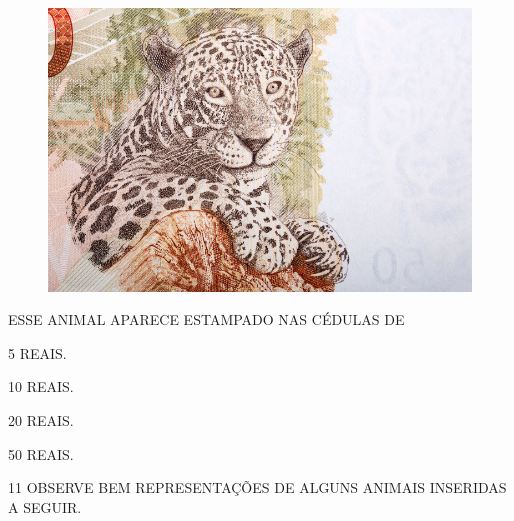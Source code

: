 \begin{minipage}{.6\textwidth}
\begin{figure}[H]
\centering
\includegraphics[width=\textwidth]{./media/SAEB_1ANO_MAT_FIGURA140.png}
\end{figure}
\end{minipage}
\hspace{0.5cm}
\begin{minipage}{.3\textwidth}
ESSE ANIMAL APARECE ESTAMPADO NAS CÉDULAS DE

\begin{escolha}%
\item 5 REAIS.

\item 10 REAIS.

\item 20 REAIS.

\item 50 REAIS.
\end{escolha}
\end{minipage}

\num{11} OBSERVE BEM REPRESENTAÇÕES DE ALGUNS ANIMAIS INSERIDAS A SEGUIR.


